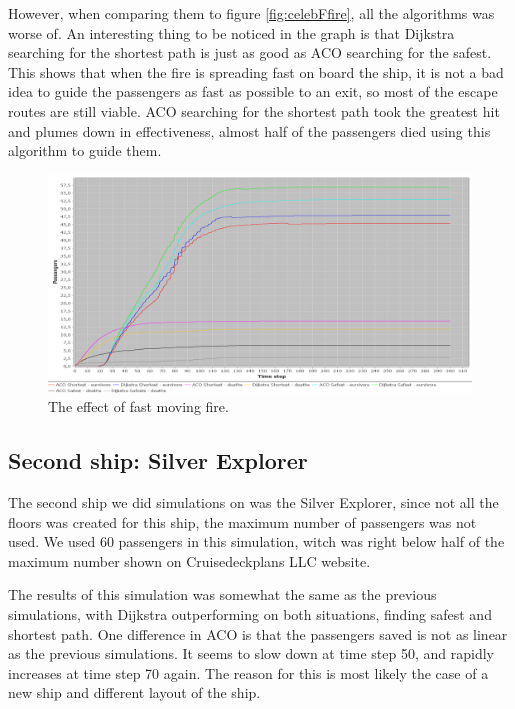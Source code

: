However, when comparing them to figure \ref{fig:celebFfire}, all the algorithms was worse of. An interesting thing to be noticed in the graph is that Dijkstra searching for the shortest path is just as good as ACO searching for the safest. This shows that when the fire is spreading fast on board the ship, it is not a bad idea to guide the passengers as fast as possible to an exit, so most of the escape routes are still viable. ACO searching for the shortest path took the greatest hit and plumes down in effectiveness, almost half of the passengers died using this algorithm to guide them.



\begin{figure} [h]
\centering
\hspace*{-1.0in}
\includegraphics[scale=0.35]{images/Graph-ship-two-60-passangers-200-rounds.png}
\caption{The effect of fast moving fire.}
\label{fig:silverExplor}
\end{figure}

\subsection{Second ship: Silver Explorer}
The second ship we did simulations on was the Silver Explorer, since not all the floors was created for this ship, the maximum number of passengers was not used. We used 60 passengers in this simulation, witch was right below half of the maximum number shown on Cruisedeckplans LLC website\cite{cruseships}.

The results of this simulation was somewhat the same as the previous simulations, with Dijkstra outperforming on both situations, finding safest and shortest path. One difference in ACO is that the passengers saved is not as linear as the previous simulations. It seems to slow down at time step 50, and rapidly increases at time step 70 again. The reason for this is most likely the case of a new ship and different layout of the ship.

